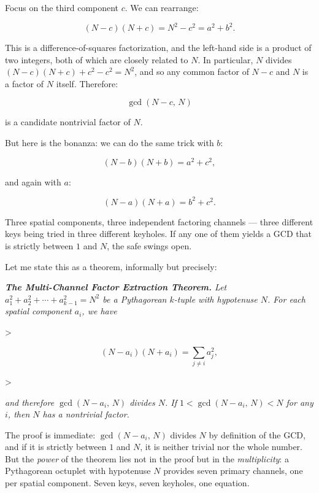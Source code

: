 \documentclass[11pt,openright,twoside]{book}
\renewenvironment{quotation}{%
  \par\vspace{8pt}%
  \begin{list}{}{%
    \setlength{\leftmargin}{2em}%
    \setlength{\rightmargin}{2em}%
  }\item[]\itshape\color{pullquote}%
}{%
  \end{list}%
  \par\vspace{8pt}%
}
\theoremstyle{definition}
\begin{document}
Focus on the third component $c$. We can rearrange:

\[(N - c)(N + c) = N^2 - c^2 = a^2 + b^2.\]

This is a difference-of-squares factorization, and the left-hand side is a product of two integers, both of which are closely related to $N$. In particular, $N$ divides $(N - c)(N + c) + c^2 - c^2 = N^2$, and so any common factor of $N - c$ and $N$ is a factor of $N$ itself. Therefore:

\[\gcd(N - c, \, N)\]

is a candidate nontrivial factor of $N$.

But here is the bonanza: we can do the same trick with $b$:

\[(N - b)(N + b) = a^2 + c^2,\]

and again with $a$:

\[(N - a)(N + a) = b^2 + c^2.\]

Three spatial components, three independent factoring channels --- three different keys being tried in three different keyholes. If any one of them yields a GCD that is strictly between $1$ and $N$, the safe swings open.

Let me state this as a theorem, informally but precisely:

\begin{quotation}
\noindent\itshape \textbf{The Multi-Channel Factor Extraction Theorem.} Let $a_1^2 + a_2^2 + \cdots + a_{k-1}^2 = N^2$ be a Pythagorean $k$-tuple with hypotenuse $N$. For each spatial component $a_i$, we have
\end{quotation}
>
\begin{quotation}
\noindent\itshape $$(N - a_i)(N + a_i) = \sum_{j \ne i} a_j^2,$$
\end{quotation}
>
\begin{quotation}
\noindent\itshape and therefore $\gcd(N - a_i, \, N)$ divides $N$. If $1 < \gcd(N - a_i, \, N) < N$ for any $i$, then $N$ has a nontrivial factor.
\end{quotation}

The proof is immediate: $\gcd(N - a_i, \, N)$ divides $N$ by definition of the GCD, and if it is strictly between $1$ and $N$, it is neither trivial nor the whole number. But the \textit{power} of the theorem lies not in the proof but in the \textit{multiplicity}: a Pythagorean octuplet with hypotenuse $N$ provides seven primary channels, one per spatial component. Seven keys, seven keyholes, one equation.
\end{document}
